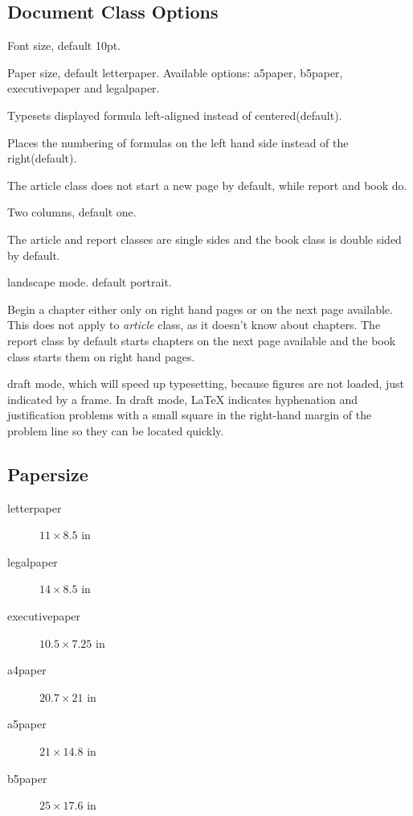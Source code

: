 \subsection{Document Class Options} 
\begin{description}[style=nextline]
    \item [11pt]
	Font size, default 10pt.
    \item [a4paper]
	Paper size, default letterpaper. Available options:
	a5paper, b5paper, executivepaper and legalpaper.
    \item [fleqn]
	Typesets displayed formula left-aligned instead of
	centered(default).
    \item [leqno]
	Places the numbering of formulas on the left hand side
	instead of the right(default).
    \item [titlepage, notitlepage]
	The article class does not start a new
	page by default, while report and book do.
    \item [twocolumn]
	Two columns, default one.
    \item [twoside,oneside]
	The article and report classes are single sides
	and the book class is double sided by default. 
    \item [landscape]
	landscape mode. default portrait.
    \item [openright,openany]
	Begin a chapter either only on right hand
	pages or on the next page available. This does not apply to
	\textit{article} class, as it doesn't know about chapters. The
	report class by default starts chapters on the next page available
	and the book class starts them on right hand pages.
    \item [draft,final]
	draft mode, which will speed up typesetting, because
	figures are not loaded, just indicated by a frame. In draft mode,
	\LaTeX{} indicates hyphenation and justification problems with a
	small square in the right-hand margin of the problem line so they
	can be located quickly.
\end{description}
\subsection{Papersize}
\begin{description}
    \item [letterpaper]	$11 \times 8.5 $ in
    \item [legalpaper]	$14 \times 8.5 $ in
    \item [executivepaper]  $10.5 \times 7.25 $ in
    \item [a4paper] $20.7 \times 21$ in
    \item [a5paper] $21 \times 14.8$ in
    \item [b5paper] $25 \times 17.6$ in
\end{description}


